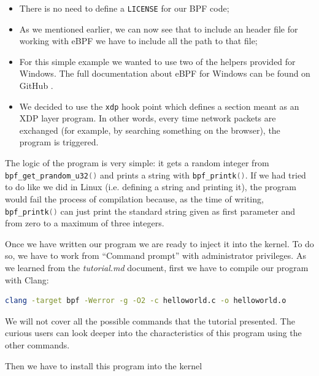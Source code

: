 \begin{itemize}
	\item 
		There is no need to define a \colorbox{backcolour}{\lstinline[style=commandline, language=bash]|LICENSE|} for our BPF code;
	\item 
		As we mentioned earlier, we can now see that to include an header file for working with eBPF we have to include all the path to that file;
	\item 
		For this simple example we wanted to use two of the helpers provided for Windows.
		The full documentation about eBPF for Windows can be found on GitHub \cite{eBPFWinDoc}.
	\item 
		We decided to use the \colorbox{backcolour}{\lstinline[style=cstyle, language=C]|xdp|} hook point which defines a section meant as an XDP layer program.
		In other words, every time network packets are exchanged (for example, by searching something on the browser), the program is triggered.
\end{itemize}

The logic of the program is very simple: it gets a random integer from \colorbox{backcolour}{\lstinline[style=cstyle, language=C]|bpf_get_prandom_u32()|} and prints a string with \colorbox{backcolour}{\lstinline[style=cstyle, language=C]|bpf_printk()|}.
If we had tried to do like we did in Linux (i.e. defining a string and printing it), the program would fail the process of compilation because, as the time of writing, \colorbox{backcolour}{\lstinline[style=cstyle, language=C]|bpf_printk()|} can just print the standard string given as first parameter and from zero to a maximum of three integers.

Once we have written our program we are ready to inject it into the kernel.
To do so, we have to work from ``Command prompt'' with administrator privileges.
As we learned from the \textit{tutorial.md} document, first we have to compile our program with Clang:

\begin{lstlisting}[style=commandline, language=bash, caption={``Hello world!'' compile command}]
	clang -target bpf -Werror -g -O2 -c helloworld.c -o helloworld.o
\end{lstlisting}

We will not cover all the possible commands that the tutorial presented.
The curious users can look deeper into the characteristics of this program using the other commands.

Then we have to install this program into the kernel 

